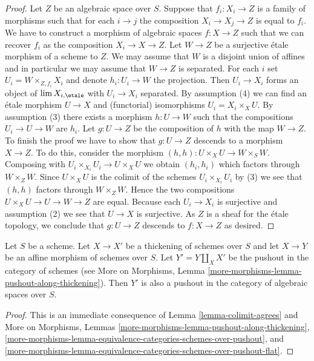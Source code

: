 \begin{proof}
Let $Z$ be an algebraic space over $S$. Suppose that $f_i : X_i \to Z$ is
a family of morphisms such that for each $i \to j$ the composition
$X_i \to X_j \to Z$ is equal to $f_i$. We have to construct a morphism
of algebraic spaces $f : X \to Z$ such that we can recover $f_i$ as
the composition $X_i \to X \to Z$. Let $W \to Z$ be a surjective
\'etale morphism of a scheme to $Z$. We may assume that $W$ is a
disjoint union of affines and in particular we may assume that
$W \to Z$ is separated. For each $i$ set
$U_i = W \times_{Z, f_i} X_i$ and denote $h_i : U_i \to W$ the projection.
Then $U_i \to X_i$ forms an object of $\lim X_{i, \etale}$
with $U_i \to X_i$ separated. By
assumption (4) we can find an \'etale morphism $U \to X$ and (functorial)
isomorphisms $U_i = X_i \times_X U$. By assumption (3) there exists a morphism
$h : U \to W$ such that the compositions $U_i \to U \to W$ are $h_i$.
Let $g : U \to Z$ be the composition of $h$ with the map $W \to Z$. To
finish the proof we have to show that $g : U \to Z$ descends to a morphism
$X \to Z$. To do this, consider the morphism
$(h, h) : U \times_X U \to W \times_S W$.
Composing with $U_i \times_{X_i} U_i \to U \times_X U$ we obtain
$(h_i, h_i)$ which factors through $W \times_Z W$. Since $U \times_X U$
is the colimit of the schemes $U_i \times_{X_i} U_i$ by (3) we see
that $(h, h)$ factors through $W \times_Z W$. Hence the two compositions
$U \times_X U \to U \to W \to Z$ are equal. Because each $U_i \to X_i$ is
surjective and assumption (2) we see that $U \to X$ is surjective.
As $Z$ is a sheaf for the \'etale topology, we conclude that
$g : U \to Z$ descends to $f : X \to Z$ as desired.
\end{proof}

\begin{lemma}
\label{lemma-pushout-along-thickening-schemes}
Let $S$ be a scheme. Let $X \to X'$ be a thickening of schemes
over $S$ and let $X \to Y$ be an affine morphism of schemes over $S$.
Let $Y' = Y \amalg_X X'$ be the pushout in the category of schemes (see
More on Morphisms, Lemma \ref{more-morphisms-lemma-pushout-along-thickening}).
Then $Y'$ is also a pushout in the category of algebraic spaces over $S$.
\end{lemma}

\begin{proof}
This is an immediate consequence of Lemma \ref{lemma-colimit-agrees} and
More on Morphisms, Lemmas
\ref{more-morphisms-lemma-pushout-along-thickening},
\ref{more-morphisms-lemma-equivalence-categories-schemes-over-pushout}, and
\ref{more-morphisms-lemma-equivalence-categories-schemes-over-pushout-flat}.
\end{proof}

